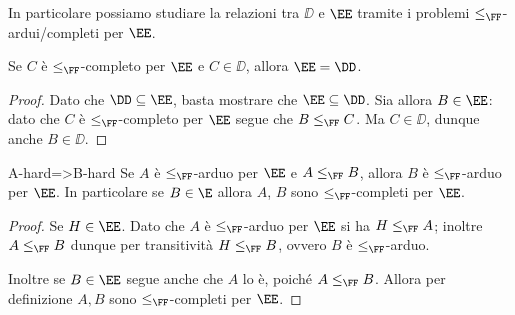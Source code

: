 In particolare possiamo studiare la relazioni tra $\DD$ e $\EE$ tramite i problemi $\leq_\FF$-ardui/completi per $\EE$.

\begin{proposition}
    {}{}
    Se $C$ è $\leq_\FF$-completo per $\EE$ e $C \in \DD$, allora $\EE = \DD$.    
\end{proposition}
\begin{proof}
    Dato che $\DD \subseteq \EE$, basta mostrare che $\EE \subseteq \DD$. Sia allora $B \in \EE$: dato che $C$ è $\leq_\FF$-completo per $\EE$ segue che $B \leq_\FF C$. Ma $C \in \DD$, dunque anche $B \in \DD$.      
\end{proof}

\begin{proposition}{}{A-hard=>B-hard}
    Se $A$ è $\leq_\FF$-arduo per $\EE$ e $A \leq_\FF B$, allora $B$ è $\leq_\FF$-arduo per $\EE$. In particolare se $B \in \E$ allora $A$, $B$ sono $\leq_\FF$-completi per $\EE$.          
\end{proposition}
\begin{proof}
    Se $H \in \EE$. Dato che $A$ è $\leq_\FF$-arduo per $\EE$ si ha $H \leq_\FF A$; inoltre $A \leq_\FF B$ dunque per transitività $H \leq_\FF B$, ovvero $B$ è $\leq_\FF$-arduo.
    
    Inoltre se $B \in \EE$ segue anche che $A$ lo è, poiché $A \leq_\FF B$. Allora per definizione $A, B$ sono $\leq_\FF$-completi per $\EE$.
\end{proof}